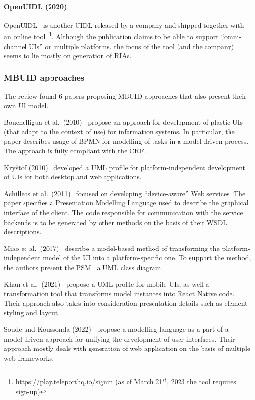 \paragraph{OpenUIDL (2020)}
OpenUIDL~\cite{Moldovan2020} is another UIDL released by a company and shipped together with an online tool~\footnote{\url{https://play.teleporthq.io/signin} (as of March 21$^{st}$, 2023 the tool requires sign-up)}.
Although the publication claims to be able to support \enquote{omni-channel UIs} on multiple platforms, the focus of the tool (and the company) seems to lie mostly on generation of RIAs.

\subsubsection{MBUID approaches}

The review found 6 papers proposing MBUID approaches that also present their own UI model.

Bouchelligua et al.\ (2010)~\cite{Bouchelligua2010} propose an approach for development of plastic UIs (that adapt to the context of use) for information systems.
In particular, the paper describes usage of BPMN for modelling of tasks in a model-driven process.
The approach is fully compliant with the CRF\@.

Kryštof (2010)~\cite{kryvstof2010lpgm} developed a UML profile for platform-independent development of UIs for both desktop and web applications.

Achilleos et al.\ (2011)~\cite{Achilleos2011} focused on developing \enquote{device-aware} Web services.
The paper specifies a Presentation Modelling Language used to describe the graphical interface of the client.
The code responsible for communication with the service backends is to be generated by other methods on the basis of their WSDL descriptions.

Miao et al.\ (2017)~\cite{Miao2017} describe a model-based method of transforming the platform-independent model of the UI into a platform-specific one.
To support the method, the authors present the PSM \textendash\ a UML class diagram.

Khan et al.\ (2021)~\cite{Khan2021} propose a UML profile for mobile UIs, as well a transformation tool that transforms model instances into React Native code.
Their approach also takes into consideration presentation details such as element styling and layout.

Soude and Koussonda (2022)~\cite{Soude2022} propose a modelling language as a part of a model-driven approach for unifying the development of user interfaces.
Their approach mostly deals with generation of web application on the basis of multiple web frameworks.

